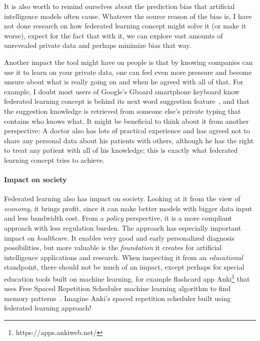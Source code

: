 It is also worth to remind ourselves about the prediction bias that artificial intelligence models often cause. Whatever the source reason of the bias is, I have not done research on how federated learning concept might solve it (or make it worse), expect for the fact that with it, we can explore vast amounts of unrevealed private data and perhaps minimize bias that way.

Another impact the tool might have on people is that by knowing companies can use it to learn on your private data, one can feel even more pressure and become unsure about what is really going on and when he agreed with all of that. For example, I doubt most users of Google's Gboard smartphone keyboard know federated learning concept is behind its next word suggestion feature~\cite{hardFederatedLearningMobile2019}, and that the suggestion knowledge is retrieved from someone else's private typing that contains who knows what. It might be beneficial to think about it from another perspective: A doctor also has lots of practical experience and has agreed not to share any personal data about his patients with others, although he has the right to treat any patient with all of his knowledge; this is exactly what federated learning concept tries to achieve.


\paragraph{Impact on society} Federated learning also has impact on society. Looking at it from the view of \emph{economy}, it brings profit, since it can make better models with bigger data input and less bandwidth cost. From a \emph{policy} perspective, it is a more compliant approach with less regulation burden. The approach has especially important impact on \emph{healthcare}. It enables very good and early personalized diagnosis possibilities, but more valuable is the \emph{foundation} it creates for artificial intelligence applications and research. When inspecting it from an \emph{educational} standpoint, there should not be much of an impact, except perhaps for special education tools built on machine learning, for example flashcard app Anki\footnote{https://apps.ankiweb.net/} that uses Free Spaced Repetition Scheduler machine learning algorithm to find memory patterns~\cite{DeckOptionsAnki, 2023_OptimizingSpacedRepetition}. Imagine Anki's spaced repetition scheduler built using federated learning approach!

